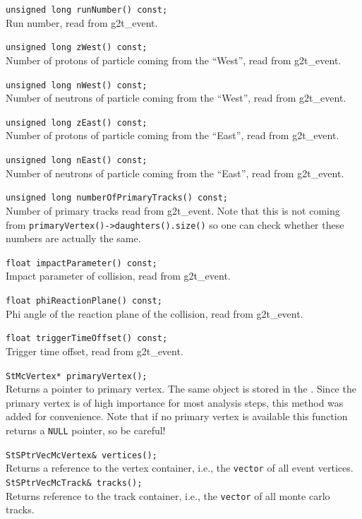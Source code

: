 \begin{Entry}
    \verb+unsigned long runNumber() const;+\\
    Run number, read from g2t\_event.

    \verb+unsigned long zWest() const;+\\
    Number of protons of particle coming from the ``West'', read from g2t\_event.

    \verb+unsigned long nWest() const;+\\
    Number of neutrons of particle coming from the ``West'', read from g2t\_event.

    \verb+unsigned long zEast() const;+\\
    Number of protons of particle coming from the ``East'', read from g2t\_event.

    \verb+unsigned long nEast() const;+\\
    Number of neutrons of particle coming from the ``East'', read from g2t\_event.

    \verb+unsigned long numberOfPrimaryTracks() const;+\\
    Number of primary tracks read from g2t\_event.  Note that this is
    not coming from {\tt primaryVertex()->daughters().size()} so one
    can check whether these numbers are actually the same.

    \verb+float impactParameter() const;+\\
    Impact parameter of collision, read from g2t\_event.

    \verb+float phiReactionPlane() const;+\\
    Phi angle of the reaction plane of the collision, read from g2t\_event.

    \verb+float triggerTimeOffset() const;+\\
    Trigger time offset, read from g2t\_event.

    \verb+StMcVertex* primaryVertex();+\\
    Returns a pointer to primary vertex. The same object is stored
    in the . Since the primary vertex is of
    high importance for most analysis steps, this method was added
    for convenience. Note that if no primary vertex is available
    this function returns a {\tt NULL} pointer, so be careful!

    \verb+StSPtrVecMcVertex& vertices();+\\
    Returns a reference to the vertex container, i.e., the {\tt vector} of all
    event vertices.
    \verb+StSPtrVecMcTrack& tracks();+\\
    Returns reference to the track container, i.e., the {\tt vector} of all
    monte carlo tracks.


\end{Entry}
